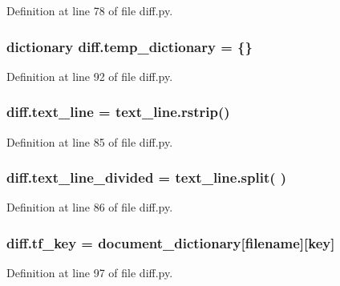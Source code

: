 Definition at line 78 of file diff.\+py.

\subsubsection[{\texorpdfstring{temp\+\_\+dictionary}{temp_dictionary}}]{\setlength{\rightskip}{0pt plus 5cm}dictionary diff.\+temp\+\_\+dictionary = \{\}}\hypertarget{namespacediff_aca04823d91158ba2b053d46e3550516d}{}\label{namespacediff_aca04823d91158ba2b053d46e3550516d}


Definition at line 92 of file diff.\+py.

\subsubsection[{\texorpdfstring{text\+\_\+line}{text_line}}]{\setlength{\rightskip}{0pt plus 5cm}diff.\+text\+\_\+line = text\+\_\+line.\+rstrip()}\hypertarget{namespacediff_afec29e46f49378a5b7b3495eecdb5e55}{}\label{namespacediff_afec29e46f49378a5b7b3495eecdb5e55}


Definition at line 85 of file diff.\+py.

\subsubsection[{\texorpdfstring{text\+\_\+line\+\_\+divided}{text_line_divided}}]{\setlength{\rightskip}{0pt plus 5cm}diff.\+text\+\_\+line\+\_\+divided = text\+\_\+line.\+split(\textquotesingle{} \textquotesingle{})}\hypertarget{namespacediff_ac8b8b94593712a4b907001ab1fa122c7}{}\label{namespacediff_ac8b8b94593712a4b907001ab1fa122c7}


Definition at line 86 of file diff.\+py.

\subsubsection[{\texorpdfstring{tf\+\_\+key}{tf_key}}]{\setlength{\rightskip}{0pt plus 5cm}diff.\+tf\+\_\+key = {\bf document\+\_\+dictionary}\mbox{[}filename\mbox{]}\mbox{[}key\mbox{]}}\hypertarget{namespacediff_ab860e167471d632882c770f12e87927e}{}\label{namespacediff_ab860e167471d632882c770f12e87927e}


Definition at line 97 of file diff.\+py.


